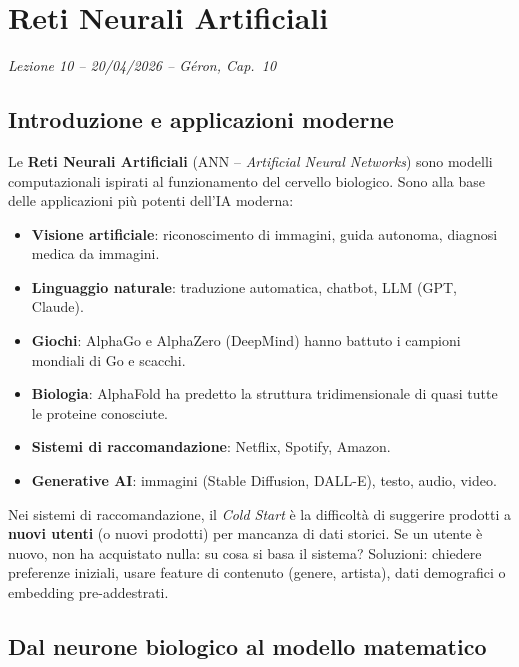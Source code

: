 \chapter{Reti Neurali Artificiali}
\begin{flushright}\small\textit{Lezione 10 -- 20/04/2026 -- G\'eron, Cap.\ 10}\end{flushright}

\section{Introduzione e applicazioni moderne}

Le \textbf{Reti Neurali Artificiali} (ANN -- \emph{Artificial Neural Networks}) sono modelli computazionali ispirati al funzionamento del cervello biologico. Sono alla base delle applicazioni più potenti dell'IA moderna:

\begin{itemize}
    \item \textbf{Visione artificiale}: riconoscimento di immagini, guida autonoma, diagnosi medica da immagini.
    \item \textbf{Linguaggio naturale}: traduzione automatica, chatbot, LLM (GPT, Claude).
    \item \textbf{Giochi}: AlphaGo e AlphaZero (DeepMind) hanno battuto i campioni mondiali di Go e scacchi.
    \item \textbf{Biologia}: AlphaFold ha predetto la struttura tridimensionale di quasi tutte le proteine conosciute.
    \item \textbf{Sistemi di raccomandazione}: Netflix, Spotify, Amazon.
    \item \textbf{Generative AI}: immagini (Stable Diffusion, DALL-E), testo, audio, video.
\end{itemize}

\begin{notebox}
Nei sistemi di raccomandazione, il \emph{Cold Start} è la difficoltà di suggerire prodotti a \textbf{nuovi utenti} (o nuovi prodotti) per mancanza di dati storici. Se un utente è nuovo, non ha acquistato nulla: su cosa si basa il sistema? Soluzioni: chiedere preferenze iniziali, usare feature di contenuto (genere, artista), dati demografici o embedding pre-addestrati.
\end{notebox}

\section{Dal neurone biologico al modello matematico}

